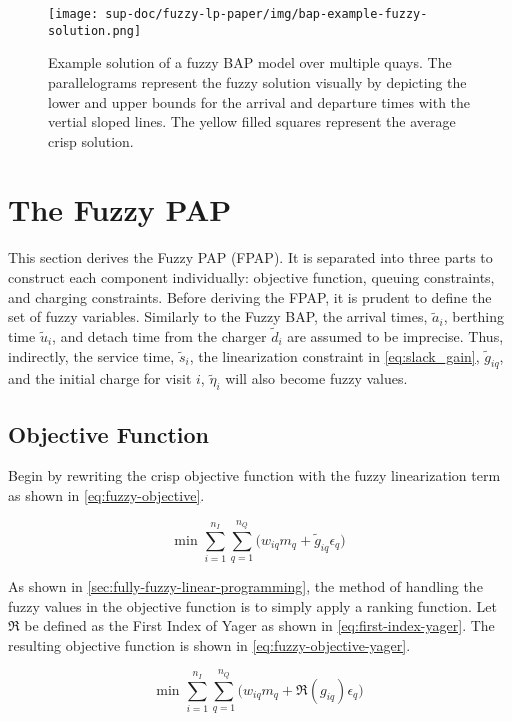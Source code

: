 \documentclass[11pt,a4paper,final]{article}
\begin{document}
\begin{figure}[htbp]
\centering
\texttt{[image: sup-doc/fuzzy-lp-paper/img/bap-example-fuzzy-solution.png]}
\caption{\label{fig:bap-example-solution}Example solution of a fuzzy BAP model over multiple quays. The parallelograms represent the fuzzy solution visually by depicting the lower and upper bounds for the arrival and departure times with the vertial sloped lines. The yellow filled squares represent the average crisp solution.}
\end{figure}
\section{The Fuzzy PAP}
\label{sec:the-fuzzy-pap}
This section derives the Fuzzy PAP (FPAP). It is separated into three parts to construct each component individually:
objective function, queuing constraints, and charging constraints. Before deriving the FPAP, it is prudent to define the
set of fuzzy variables. Similarly to the Fuzzy BAP, the arrival times, \(\tilde{a}_i\), berthing time \(\tilde{u}_i\), and
detach time from the charger \(\tilde{d}_i\) are assumed to be imprecise. Thus, indirectly, the service time,
\(\tilde{s}_i\), the linearization constraint in \ref{eq:slack_gain}, \(\tilde{g}_{iq}\), and the initial charge for visit
\(i\), \(\tilde{\eta}_i\) will also become fuzzy values.

\subsection{Objective Function}
\label{sec:orgd7244a2}
Begin by rewriting the crisp objective function with the fuzzy linearization term as shown in \ref{eq:fuzzy-objective}.

\begin{equation}
\label{eq:fuzzy-objective}
\text{min } \sum_{i=1}^{n_I} \sum_{q=1}^{n_Q} \Big( w_{iq} m_q + \tilde{g}_{iq} \epsilon_{q} \Big)
\end{equation}

As shown in \ref{sec:fully-fuzzy-linear-programming}, the method of handling the fuzzy values in the objective function is to
simply apply a ranking function. Let \(\mathfrak{R}\) be defined as the First Index of Yager as shown in \ref{eq:first-index-yager}.
The resulting objective function is shown in \ref{eq:fuzzy-objective-yager}.

\begin{equation}
\label{eq:fuzzy-objective-yager}
\text{min } \sum_{i=1}^{n_I} \sum_{q=1}^{n_Q} \Big( w_{iq} m_q + \mathfrak{R}(g_{iq}) \epsilon_{q} \Big)
\end{equation}
\end{document}
